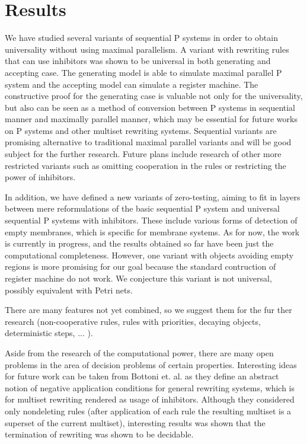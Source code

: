 \documentclass[a4paper,12pt,oneside,openany]{article}
\begin{document}
\section*{Results}
We have studied several variants of sequential P systems in order to
obtain universality without using maximal parallelism. A variant with
rewriting rules that can use inhibitors was shown to be universal in both
generating and accepting case\cite{Kovac14Inhibitors}. The generating model is able to simulate
maximal parallel P system and the accepting model can simulate a
register machine. The constructive proof for the generating case is
valuable not only for the universality, but also can be seen as a method
of conversion between P systems in sequential manner and maximally
parallel manner, which may be essential for future works on P systems
and other multiset rewriting systems. Sequential variants are promising
alternative to traditional maximal parallel variants and will be good
subject for the further research. Future plans include research of other
more restricted variants such as omitting cooperation in the rules or
restricting the power of inhibitors.

In addition, we have defined a new variants of zero-testing, aiming to fit
in layers between mere reformulations of the basic sequential P system
and universal sequential P systems with inhibitors. These include various
forms of detection of empty membranes, which is specific for membrane
systems. As for now, the work is currently in progress, and the results
obtained so far have been just the computational completeness.
However, one variant with objects avoiding empty regions is more
promising for our goal because the standard contruction of register
machine do not work. We conjecture this variant is not universal, possibly
equivalent with Petri nets.

There are many features not yet combined, so we suggest them for the
fur ther research (non-cooperative rules, rules with priorities, decaying
objects, deterministic steps, ... ).

Aside from the research of the computational power, there are many
open problems in the area of decision problems of certain properties.
Interesting ideas for future work can be taken from Bottoni et. al. as they
define an abstract notion of negative application conditions for general
rewriting systems, which is for multiset rewriting rendered as usage of
inhibitors. Although they considered only nondeleting rules (after
application of each rule the resulting multiset is a superset of the current
multiset), interesting results was shown that the termination of rewriting
was shown to be decidable.
\end{document}
